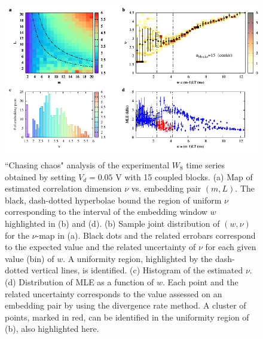 \begin{figure}[H]
    \centering
    \includegraphics[width=\linewidth]{../blocks/15_blocks/middle/2e5_points/plots/chaos_low.pdf}
    \caption{``Chasing chaos" analysis of the experimental $W_8$ time series obtained by setting $V_d=0.05$ V with 15 coupled blocks.
    (a) Map of estimated correlation dimension $\nu$ vs. embedding pair $(m, L)$.
    The black, dash-dotted hyperbolae bound the region of uniform $\nu$ corresponding to the interval of the
    embedding window $w$ highlighted in (b) and (d).
    (b) Sample joint distribution of $(w,\nu)$ for the $\nu$-map in (a).
    Black dots and the related errobars correspond to the expected value and the related uncertainty of $\nu$
    for each given value (bin) of $w$. A uniformity region, highlighted by the dash-dotted vertical lines,
    is identified. (c) Histogram of the estimated $\nu$. (d) Distribution of MLE as a function of $w$. Each point and the related
    uncertainty corresponds to the value assessed on an embedding pair by using the divergence rate method.
    A cluster of points, marked in red, can be identified in the uniformity region of (b), also highlighted here.}
    \label{fig:15 blocks middle chaos}
\end{figure}



